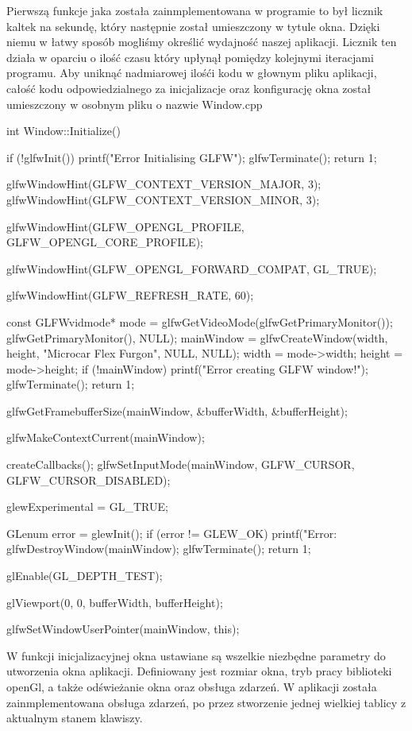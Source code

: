 \documentclass[a4paper,12pt]{article}
\numberwithin{equation}{section}
\begin{document}
Pierwszą funkcje jaka została zainmplementowana w programie to był licznik kaltek na sekundę, który następnie został umieszczony w tytule okna. Dzięki niemu w łatwy sposób mogliśmy określić wydajność naszej aplikacji. Licznik ten działa w oparciu o ilość czasu który upłynął pomiędzy kolejnymi iteracjami programu.
\newline
\indent Aby uniknąć nadmiarowej ilośći kodu w głownym pliku aplikacji, całość kodu odpowiedzialnego za inicjalizacje oraz konfigurację okna został umieszczony w osobnym pliku o nazwie Window.cpp
\begin{cppcode}

int Window::Initialize()
{
	if (!glfwInit())
	{
		printf("Error Initialising GLFW");
		glfwTerminate();
		return 1;
	}

	glfwWindowHint(GLFW_CONTEXT_VERSION_MAJOR, 3);
	glfwWindowHint(GLFW_CONTEXT_VERSION_MINOR, 3);

	glfwWindowHint(GLFW_OPENGL_PROFILE, GLFW_OPENGL_CORE_PROFILE);

	glfwWindowHint(GLFW_OPENGL_FORWARD_COMPAT, GL_TRUE);

	glfwWindowHint(GLFW_REFRESH_RATE, 60);

	const GLFWvidmode* mode = glfwGetVideoMode(glfwGetPrimaryMonitor());
    glfwGetPrimaryMonitor(), NULL);
	mainWindow = glfwCreateWindow(width, height, "Microcar Flex Furgon", NULL, NULL);
	width = mode->width;
	height = mode->height;
	if (!mainWindow)
	{
		printf("Error creating GLFW window!");
		glfwTerminate();
		return 1;
	}

	glfwGetFramebufferSize(mainWindow, &bufferWidth, &bufferHeight);

	glfwMakeContextCurrent(mainWindow);

	createCallbacks();
	glfwSetInputMode(mainWindow, GLFW_CURSOR, GLFW_CURSOR_DISABLED);

	glewExperimental = GL_TRUE;

	GLenum error = glewInit();
	if (error != GLEW_OK)
	{
		printf("Error: %
		glfwDestroyWindow(mainWindow);
		glfwTerminate();
		return 1;
	}

	glEnable(GL_DEPTH_TEST);

	glViewport(0, 0, bufferWidth, bufferHeight);

	glfwSetWindowUserPointer(mainWindow, this);
}
\end{cppcode}

W funkcji inicjalizacyjnej okna ustawiane są wszelkie niezbędne parametry do utworzenia okna aplikacji. Definiowany jest rozmiar okna, tryb pracy biblioteki openGl, a także odświeżanie okna oraz obsługa zdarzeń. W aplikacji została zainmplementowana obsługa zdarzeń, po przez stworzenie jednej wielkiej tablicy z aktualnym stanem klawiszy.
\newline
\end{document}
